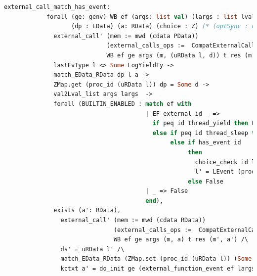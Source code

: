 \begin{lstlisting}[language=Caml]     
          external_call_match_has_event:
            forall (ge: genv) WB ef (args: list val) (largs : list lval) t res (m m' : mem) l l' d d' ds' 
                   (dp : EData) (a: RData) (choice : Z) (* (optSync : option SyncChanPool) *),
              external_call' (mem := mwd (cdata PData)) 
                             (external_calls_ops :=  CompatExternalCalls.compatlayer_extcall_ops (LH  <@$\oplus$@>  L64))
                             WB ef ge args (m, (uRData l, d)) t res (m', (ds', d')) ->
              lastEvType l <> Some LogYieldTy ->
              match_EData_RData dp l a ->
              ZMap.get (proc_id (uRData l)) dp = Some d ->
              val2Lval_list args largs  ->
              forall (BUILTIN_ENABLED : match ef with
                                        | EF_external id _ => 
                                          if peq id thread_yield then False
                                          else if peq id thread_sleep then False
                                               else if has_event id 
                                                    then
                                                      choice_check id largs (uRData l) d = choice /\
                                                      l' = LEvent (proc_id (uRData l)) (LogPrim id largs choice (snap_func d)) :: l 
                                                    else False 
                                        | _ => False
                                        end),
              exists (a': RData),
                external_call' (mem := mwd (cdata RData)) 
                               (external_calls_ops :=  CompatExternalCalls.compatlayer_extcall_ops (pbthread  <@$\oplus$@>  L64))
                               WB ef ge args (m, a) t res (m', a') /\
                ds' = uRData l' /\
                match_EData_RData (ZMap.set (proc_id (uRData l)) (Some d') dp) l' a' /\
                kctxt a' = do_init ge (external_function_event ef largs l choice (snap_func d)) l (kctxt a);
\end{lstlisting}
         
